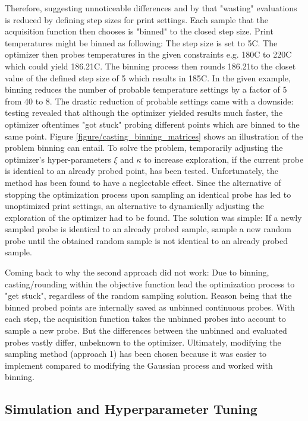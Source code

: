 \begin{figure}
\end{figure} Therefore, suggesting unnoticeable differences and by that "wasting" evaluations is reduced by defining step sizes for print settings. Each sample that the acquisition function then chooses is "binned" to the closed step size. Print temperatures might be binned as following: The step size is set to 5\textdegree C. The optimizer then probes temperatures in the given constraints e.g. 180\textdegree C to 220\textdegree C which could yield 186.21\textdegree C. The binning process then rounds 186.21\textdegree to the closet value of the defined step size of 5 which results in 185\textdegree C. In the given example, binning reduces the number of probable temperature settings by a factor of 5 from 40 to 8. The drastic reduction of probable settings came with a downside: testing revealed that although the optimizer yielded results much faster, the optimizer oftentimes "got stuck" probing different points which are binned to the same point. Figure \ref{figure/casting_binning_matrices} shows an illustration of the problem binning can entail. To solve the problem, temporarily adjusting the optimizer's hyper-parameters $\xi$ and $\kappa$ to increase exploration, if the current probe is identical to an already probed point, has been tested. Unfortunately, the method has been found to have a neglectable effect. Since the alternative of stopping the optimization process upon sampling an identical probe has led to unoptimized print settings, an alternative to dynamically adjusting the exploration of the optimizer had to be found. The solution was simple: If a newly sampled probe is identical to an already probed sample, sample a new random probe until the obtained random sample is not identical to an already probed sample.

Coming back to why the second approach did not work: Due to binning, casting/rounding within the objective function lead the optimization process to "get stuck", regardless of the random sampling solution. Reason being that the binned probed points are internally saved as unbinned continuous probes. With each step, the acquisition function takes the unbinned probes into account to sample a new probe. But the differences between the unbinned and evaluated probes vastly differ, unbeknown to the optimizer. Ultimately, modifying the sampling method (approach 1) has been chosen because it was easier to implement compared to modifying the Gaussian process and worked with binning.


\subsection{Simulation and Hyperparameter Tuning}

